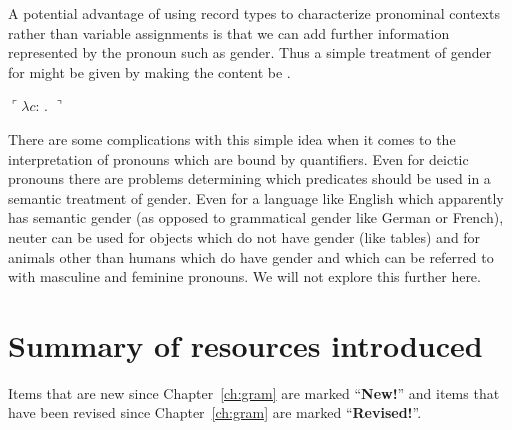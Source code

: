 A potential advantage of using record types to characterize pronominal contexts
rather than variable assignments is that we can add further
information represented by the pronoun such as gender.   Thus a simple
treatment of gender for \preveg{} might be given by making the content
be \nexteg{}.
\begin{ex}
  $\ulcorner\lambda c$:
                                 . 
$\urcorner$ 
\end{ex} 
There are some complications with this simple
idea when it comes to the interpretation of pronouns which are bound
by quantifiers.  Even for deictic pronouns there are problems
determining which predicates should be used in a semantic treatment of
gender.  Even for a language like English which apparently has
semantic gender (as opposed to grammatical gender like German or
French), neuter can be used for objects which do not have gender (like
tables) and for animals other than humans which do have gender and
which can be referred to with masculine and feminine pronouns.  We
will not explore this further here.


\section{Summary of resources introduced}


Items that are new since Chapter~\ref{ch:gram} are marked
``\textbf{New!}'' and items that have been revised since
Chapter~\ref{ch:gram} are marked ``\textbf{Revised!}''.

